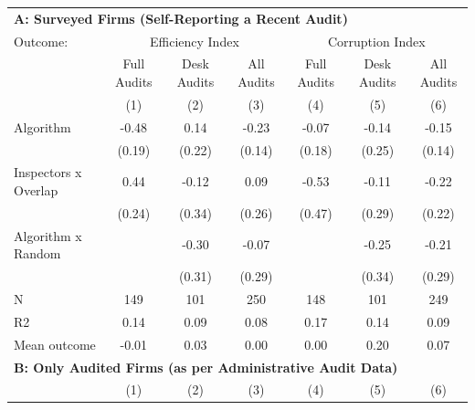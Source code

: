 \begin{tabular}{lccc|ccc} \toprule
\multicolumn{7}{l}{\textbf{A: Surveyed Firms (Self-Reporting a Recent Audit)}} \\ \multicolumn{1}{l}{Outcome:} & \multicolumn{3}{c}{Efficiency Index} & \multicolumn{3}{c}{Corruption Index} \\ \multicolumn{1}{l}{} & Full Audits & Desk Audits & All Audits & Full Audits & Desk Audits & All Audits \\ \multicolumn{1}{l}{} & (1) & (2) & (3) & (4) & (5) & (6) \\ \midrule
Algorithm   &       -0.48\sym{**} &        0.14         &       -0.23         &       -0.07         &       -0.14         &       -0.15         \\
            &      (0.19)         &      (0.22)         &      (0.14)         &      (0.18)         &      (0.25)         &      (0.14)         \\
\addlinespace
Inspectors x Overlap&        0.44\sym{*}  &       -0.12         &        0.09         &       -0.53         &       -0.11         &       -0.22         \\
            &      (0.24)         &      (0.34)         &      (0.26)         &      (0.47)         &      (0.29)         &      (0.22)         \\
\addlinespace
Algorithm x Random&                     &       -0.30         &       -0.07         &                     &       -0.25         &       -0.21         \\
            &                     &      (0.31)         &      (0.29)         &                     &      (0.34)         &      (0.29)         \\
\midrule
N           &         149         &         101         &         250         &         148         &         101         &         249         \\
R2          &        0.14         &        0.09         &        0.08         &        0.17         &        0.14         &        0.09         \\
Mean outcome&       -0.01         &        0.03         &        0.00         &        0.00         &        0.20         &        0.07         \\

\midrule \multicolumn{7}{l}{\textbf{B: Only Audited Firms (as per Administrative Audit Data)}} \\ \multicolumn{1}{l}{} & (1) & (2) & (3) & (4) & (5) & (6) \\ \midrule


\end{tabular}
